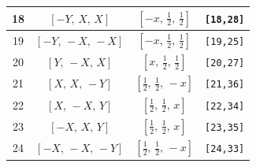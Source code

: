 \documentclass[fleqn,8pt]{jsarticle}
\begin{document}
\begin{longtable}{cccc}
18 & $\left[ - Y,\, X,\, X \right]$ & $\left[ - x,\, \frac{1}{2},\, \frac{1}{2} \right]$ & {\tt [18,28]} \\ \hline
19 & $\left[ - Y,\, - X,\, - X \right]$ & $\left[ - x,\, \frac{1}{2},\, \frac{1}{2} \right]$ & {\tt [19,25]} \\ \hline
20 & $\left[ Y,\, - X,\, X \right]$ & $\left[ x,\, \frac{1}{2},\, \frac{1}{2} \right]$ & {\tt [20,27]} \\ \hline
21 & $\left[ X,\, X,\, - Y \right]$ & $\left[ \frac{1}{2},\, \frac{1}{2},\, - x \right]$ & {\tt [21,36]} \\ \hline
22 & $\left[ X,\, - X,\, Y \right]$ & $\left[ \frac{1}{2},\, \frac{1}{2},\, x \right]$ & {\tt [22,34]} \\ \hline
23 & $\left[ - X,\, X,\, Y \right]$ & $\left[ \frac{1}{2},\, \frac{1}{2},\, x \right]$ & {\tt [23,35]} \\ \hline
24 & $\left[ - X,\, - X,\, - Y \right]$ & $\left[ \frac{1}{2},\, \frac{1}{2},\, - x \right]$ & {\tt [24,33]} \\
\end{longtable}
\renewcommand{\arraystretch}{1.2}
\end{document}
